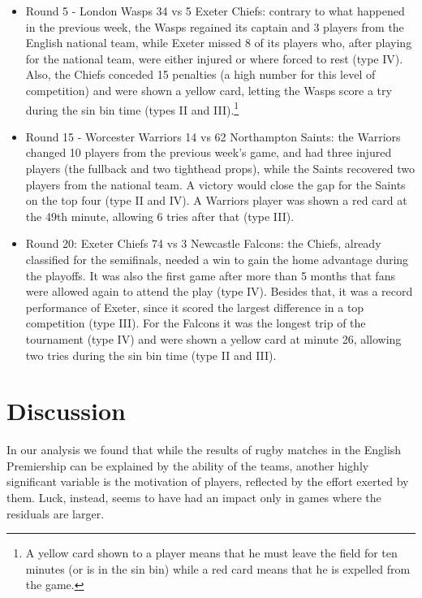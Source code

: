 \documentclass[]{article}
\begin{document}
\begin{itemize}
	\item Round 5 - London Wasps 34 vs 5 Exeter Chiefs: contrary to what happened in the previous week, the Wasps regained its captain and 3 players from the English national team, while Exeter missed 8 of its players who, after playing for the national team, were either injured or where forced to rest (type IV). Also, the Chiefs conceded 15 penalties (a high number for this level of competition) and were shown a yellow card, letting the Wasps score a try during the sin bin time (types II and III).\footnote{A yellow card shown to a player means that he must leave the field for  ten minutes (or is in the sin bin) while a red card means that he is expelled from the game.}
	\item Round 15 - Worcester Warriors 14 vs 62 Northampton Saints: the Warriors changed 10 players from the previous week's game, and had three injured players (the fullback and two tighthead props), while the Saints recovered two players from the national team. A victory would close the gap for the Saints on the top four (type II and IV). A Warriors player was shown a red card at the 49th minute, allowing 6 tries after that (type III).
	\item Round 20: Exeter Chiefs 74 vs 3 Newcastle Falcons: the Chiefs, already classified for the semifinals, needed a win to gain the home advantage during the playoffs. It was also the first game after more than 5 months that fans were allowed again to attend the play (type IV). Besides that, it was a record performance of Exeter, since it scored the largest difference in a top competition (type III). For the Falcons it was the longest trip of the tournament (type IV) and were shown a yellow card at minute 26, allowing two tries during the sin bin time (type II and III).
\end{itemize}

\section{Discussion}

In our analysis we found that while the results of rugby matches in the English Premiership can be explained by the ability of the teams, another highly significant variable is the motivation of players, reflected by the effort exerted by them. Luck, instead, seems to have had an impact only in games where the residuals are larger. \\
\end{document}
